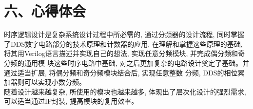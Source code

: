 \documentclass{article}
\newcommand{\fourhao}{\fontsize{14pt}{\baselineskip}\selectfont} %
\newcommand{\xiaosihao}{\fontsize{12pt}{\baselineskip}\selectfont} %
\begin{document}
\section*{\fourhao 六、心得体会}
\xiaosihao
{}
时序逻辑设计是复杂系统设计过程中所必需的, 通过分频器的设计流程, 同时掌握了DDS数字电路部分的技术原理和计数器的应用, 
在理解和掌握这些原理的基础, 将其用Verilog语言描述并实现自己的想法, 实现任意分频模块, 并完成偶分频和奇分频的通用模
块这些时序电路中基础, 对之后更加复杂的电路设计奠定了基础。并通过适当扩展, 将偶分频和奇分频模块结合后, 实现任意整数
分频, DDS的相位累加器则可以实现小数分频。\\

随着设计越来越复杂, 所使用的模块也越来越多, 体现出了层次化设计的强烈需求, 可以适当通过IP封装, 提高模块的复用效率。
\end{document}
